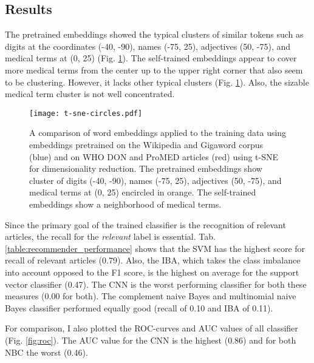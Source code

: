 \subsection{Results}
  The pretrained embeddings showed the typical clusters of similar tokens such as digits at the coordinates (-40, -90), names (-75, 25), adjectives (50, -75), and medical terms at (0, 25) (Fig. \ref{fig:t-sne}).
  The self-trained embeddings appear to cover more medical terms from the center up to the upper right corner that also seem to be clustering.
  However, it lacks other typical clusters (Fig. \ref{fig:t-sne}).
  Also, the sizable medical term cluster is not well concentrated.
  \begin{figure}[h!]
    \centering
    \texttt{[image: t-sne-circles.pdf]}
    \caption{A comparison of word embeddings applied to the training data using embeddings pretrained on the Wikipedia and Gigaword corpus (blue) and on WHO DON and ProMED articles (red) using t-SNE for dimensionality reduction. The pretrained embeddings show cluster of digits (-40, -90), names (-75, 25), adjectives (50, -75), and medical terms at (0, 25) encircled in orange. The self-trained embeddings show a neighborhood of medical terms.}
  \label{fig:t-sne}
  \end{figure}

  Since the primary goal of the trained classifier is the recognition of relevant articles, the recall for the \textsl{relevant} label is essential.
  Tab. \ref{table:recommender_performance} shows that the SVM has the highest score for recall of relevant articles (0.79).
  Also, the IBA, which takes the class imbalance into account opposed to the F1 score, is the highest on average for the support vector classifier (0.47).
  The CNN is the worst performing classifier for both these measures (0.00 for both).
  The complement naive Bayes and multinomial naive Bayes classifier performed equally good (recall of 0.10 and IBA of 0.11).

  For comparison, I also plotted the ROC-curves and AUC values of all classifier (Fig. \ref{fig:roc}). The AUC value for the CNN is the highest (0.86) and for both NBC the worst (0.46).

